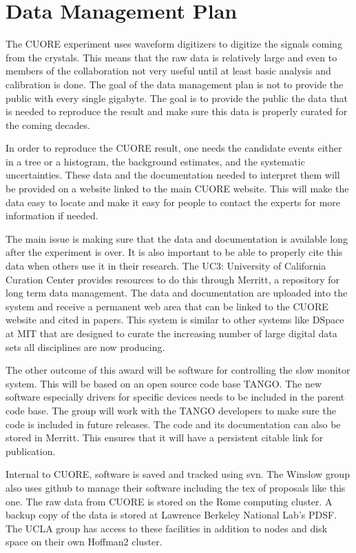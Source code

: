 \section{Data Management Plan}
The CUORE experiment uses waveform digitizers to digitize the signals coming from the crystals. This means that the raw data is relatively large and even to members of the collaboration not very useful until at least basic analysis and calibration is done. The goal of the data management plan is not to provide the public with every single gigabyte.  The goal is to provide the public the data that is needed to reproduce the result and make sure this data is properly curated for the coming decades.

In order to reproduce the CUORE result,  one needs the candidate events either in a tree or a histogram, the background estimates, and the systematic uncertainties. These data and the documentation needed to interpret them will be provided on a website linked to the main CUORE website. This will make the data easy to locate and make it easy for people to contact the experts for more information if needed.

The main issue is making sure that the data and documentation is available long after the experiment is over. It is also important to be able to properly cite this data when others use it in their research. The UC3: University of California Curation Center provides resources to do this through Merritt, a repository for long term data management. The data and documentation are uploaded into the system and receive a permanent web area that can be linked to the CUORE website and cited in papers. This system is similar to other systems like DSpace at MIT that are designed to curate the increasing number of large digital data sets all disciplines are now producing.

The other outcome of this award will be software for controlling the slow monitor system. This will be based on an open source code base TANGO. The new software especially drivers for specific devices needs to be included in the parent code base. The group will work with the TANGO developers to make sure the code is included in future releases. The code and its documentation can also be stored in Merritt. This ensures that it will have a persistent citable link for publication.

Internal to CUORE, software is saved and tracked using svn. The Winslow group also uses github to manage their software including the tex of proposals like this one. The raw data from CUORE is stored on the Rome computing cluster. A backup copy of the data is stored at Lawrence Berkeley National Lab's PDSF. The UCLA group has access to these facilities in addition to nodes and disk space on their own Hoffman2 cluster.